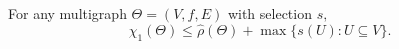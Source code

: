 For any multigraph $\Theta = (V, f, E)$ with selection $s,$
$$\chi_1(\Theta) \leq \hat{\rho}(\Theta) + \max\{s(U): U \subseteq V\}.$$

